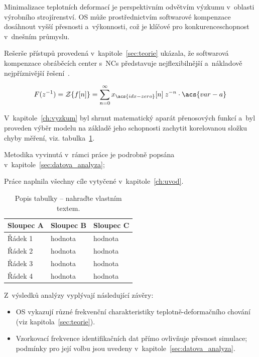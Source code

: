 \begin{samepage}
Minimalizace teplotních deformací je perspektivním odvětvím výzkumu v~oblasti výrobního strojírenství. \Acf{OS} může prostřednictvím softwarové kompenzace dosáhnout vyšší přesnosti a~výkonnosti, což je klíčové pro konkurenceschopnost v~dnešním průmyslu.\par
Rešerše přístupů provedená v~kapitole~\ref{sec:teorie} ukázala, že softwarová kompenzace
obráběcích center s~\aclp{NC} představuje nejflexibilnější
a~nákladově nejpříznivější řešení~\cite{noauthor_penny_2026}.\par

\begin{equation}
F(z^{-1})=\mathcal{Z}\lbrace f[n]\rbrace=\sum_{n=0}^{\infty} x_{\acs{idx-zero}}[n]\:z^{-n}\cdot\acs{var-a}
\end{equation}\label{eqn:laplace}

V~kapitole~\ref{ch:vyzkum} byl shrnut matematický aparát přenosových funkcí a~byl
proveden výběr modelu na základě jeho schopnosti zachytit korelovanou složku
chyby měření, viz. tabulka~\ref{tab:vzor}.\par
Metodika vyvinutá v~rámci práce je podrobně popsána v~kapitole~\ref{sec:datova_analyza};\par

Práce naplnila všechny cíle vytyčené v~kapitole~\ref{ch:uvod}.
\end{samepage}


\begin{table}[htbp]
    \centering
    \caption{Popis tabulky -- nahraďte vlastním textem.\label{tab:vzor}}
    \begin{tabularx}{\textwidth}{l X X}
        \toprule
        \textbf{Sloupec A} & \textbf{Sloupec B} & \textbf{Sloupec C} \\
        \midrule
        Řádek 1 & hodnota & hodnota \\
        Řádek 2 & hodnota & hodnota \\
        Řádek 3 & hodnota & hodnota \\
        Řádek 4 & hodnota & hodnota \\
        \bottomrule
    \end{tabularx}
\end{table}

\newpage
Z~výsledků analýzy vyplývají následující závěry:

\begin{itemize}[noitemsep]
    \item \ac{OS} vykazují různé frekvenční charakteristiky teplotně-deformačního chování
          (viz kapitola~\ref{sec:teorie}).
    \item Vzorkovací frekvence identifikačních dat přímo ovlivňuje přesnost simulace;
          podmínky pro její volbu jsou uvedeny v~kapitole~\ref{sec:datova_analyza}.
\end{itemize}
